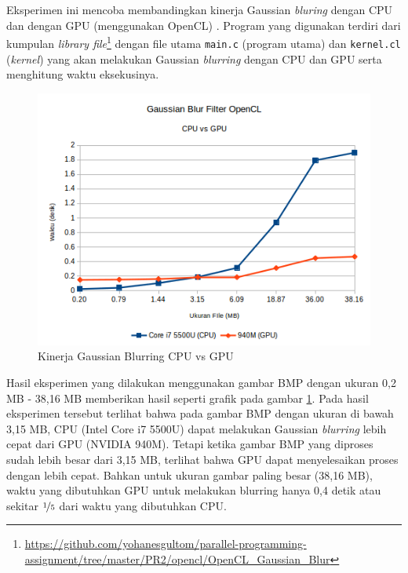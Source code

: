 Eksperimen ini mencoba membandingkan kinerja Gaussian \textit{bluring} dengan CPU dan dengan GPU (menggunakan OpenCL) \cite{opencl.gaussianblur}. Program yang digunakan terdiri dari kumpulan \textit{library file}\footnote{\url{https://github.com/yohanesgultom/parallel-programming-assignment/tree/master/PR2/opencl/OpenCL_Gaussian_Blur}} dengan file utama \verb|main.c| (program utama) dan \verb|kernel.cl| (\textit{kernel}) yang akan melakukan Gaussian \textit{blurring} dengan CPU dan GPU serta menghitung waktu eksekusinya.

\begin{figure}
	\centering
	\includegraphics[width=1.0\textwidth]
	{pics/gaussian_blur_cpu_gpu.png}
	\caption{Kinerja Gaussian Blurring CPU vs GPU}
	\label{fig:gaussian_blur_cpu_gpu}
\end{figure}

Hasil eksperimen yang dilakukan menggunakan gambar BMP dengan ukuran 0,2 MB - 38,16 MB memberikan hasil seperti grafik pada gambar \ref{fig:gaussian_blur_cpu_gpu}. Pada hasil eksperimen tersebut terlihat bahwa pada gambar BMP dengan ukuran di bawah 3,15 MB, CPU (Intel Core i7 5500U) dapat melakukan Gaussian \textit{blurring} lebih cepat dari GPU (NVIDIA 940M). Tetapi ketika gambar BMP yang diproses sudah lebih besar dari 3,15 MB, terlihat bahwa GPU dapat menyelesaikan proses dengan lebih cepat. Bahkan untuk ukuran gambar paling besar (38,16 MB), waktu yang dibutuhkan GPU untuk melakukan blurring hanya 0,4 detik atau sekitar $\nicefrac{1}{5}$ dari waktu yang dibutuhkan CPU.